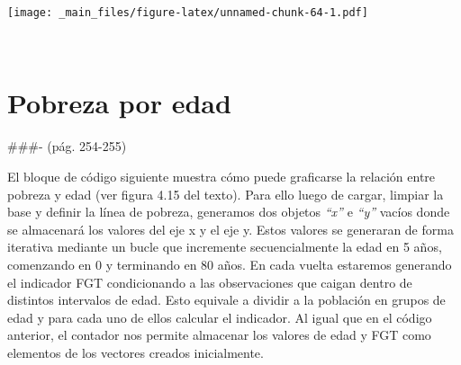 \documentclass[
]{book}
\begin{document}
\texttt{[image: \_main\_files/figure-latex/unnamed-chunk-64-1.pdf]}

~

\hypertarget{pobreza-por-edad}{%
\section{Pobreza por edad}\label{pobreza-por-edad}}

\#\#\#- (pág. 254-255)

El bloque de código siguiente muestra cómo puede graficarse la relación entre pobreza y edad (ver figura 4.15 del texto). Para ello luego de cargar, limpiar la base y definir la línea de pobreza, generamos dos objetos \emph{``x''} e \emph{``y''} vacíos donde se almacenará los valores del eje x y el eje y. Estos valores se generaran de forma iterativa mediante un bucle que incremente secuencialmente la edad en 5 años, comenzando en 0 y terminando en 80 años. En cada vuelta estaremos generando el indicador FGT condicionando a las observaciones que caigan dentro de distintos intervalos de edad. Esto equivale a dividir a la población en grupos de edad y para cada uno de ellos calcular el indicador. Al igual que en el código anterior, el contador nos permite almacenar los valores de edad y FGT como elementos de los vectores creados inicialmente.
\end{document}
